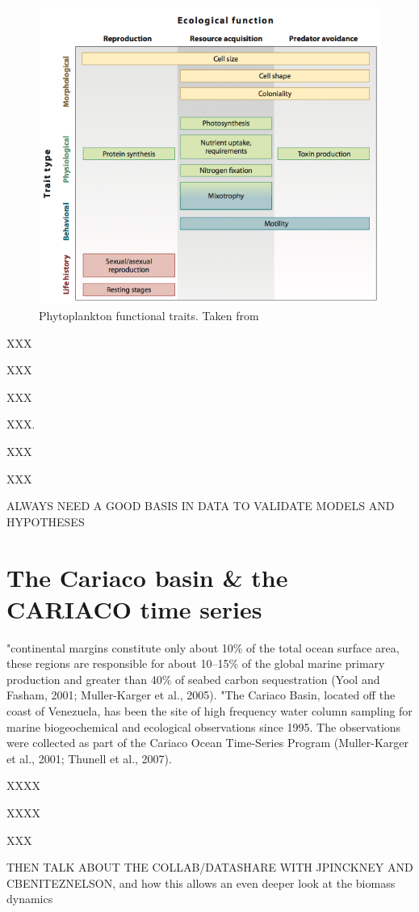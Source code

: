 \begin{figure}
\centering
\includegraphics[width=0.7\linewidth]{./Chp1-Intro/Fig_litchman2008.png}
\caption[Scheme]{\small{Phytoplankton functional traits. Taken from \citet{Litchman2008}}}
\label{phytotrait}
\end{figure}

XXX

XXX

XXX

XXX. 

XXX

XXX

ALWAYS NEED A GOOD BASIS IN DATA TO VALIDATE MODELS AND HYPOTHESES

\section{The Cariaco basin \& the CARIACO time series}

"continental margins constitute only about 10\% of the total ocean surface area, these regions are responsible for about 10–15\% of the global marine primary production and greater than 40\% of seabed carbon sequestration (Yool and Fasham, 2001; Muller-Karger et al., 2005). 
"The Cariaco Basin, located off the coast of Venezuela, has been the site of high frequency water column sampling for marine biogeochemical and ecological observations since 1995. The observations were collected as part of the Cariaco Ocean Time-Series Program (Muller-Karger et al., 2001; Thunell et al., 2007). 

XXXX

XXXX

XXX

THEN TALK ABOUT THE COLLAB/DATASHARE WITH JPINCKNEY AND CBENITEZNELSON, and how this allows an even deeper look at the biomass dynamics


